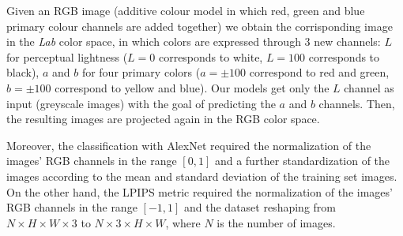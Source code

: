 Given an RGB image (additive colour model in which red, green and blue primary colour channels are added together)
we obtain the corrisponding image in the \textit{Lab} color space, in which colors are expressed through 3 new
channels: $L$ for perceptual lightness ($L=0$ corresponds to white, $L=100$ corresponds to black), $a$ and $b$ for
four primary colors ($a=\pm100$ correspond to red and green, $b=\pm100$ correspond to yellow and blue). Our models get only the $L$ channel as input (greyscale images) with the goal of predicting the $a$ and $b$
channels. Then, the resulting images are projected again in the RGB color space.

Moreover, the classification with AlexNet required the normalization of the images' RGB channels in the
range $[0,1]$ and a further standardization of the images according to the mean and standard deviation of the
training set images. On the other hand, the LPIPS metric required the normalization of the images' RGB channels in the range $[-1,1]$ and
the dataset reshaping from $N\times H\times W\times3$ to $N\times3\times H\times W$, where $N$ is the number of images.